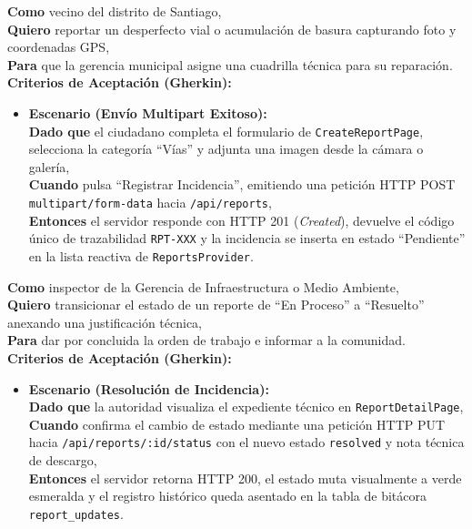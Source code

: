 \documentclass[12pt,a4paper]{article}
\begin{document}
\begin{tcolorbox}[colback=tableHeader,colframe=unsaacBlue,title=\textbf{HU-02: Registro de Incidencia Urbana con Geolocalización y Fotografía}]
\textbf{Como} vecino del distrito de Santiago, \\
\textbf{Quiero} reportar un desperfecto vial o acumulación de basura capturando foto y coordenadas GPS, \\
\textbf{Para} que la gerencia municipal asigne una cuadrilla técnica para su reparación.
\tcblower
\textbf{Criterios de Aceptación (Gherkin):}
\begin{itemize}[leftmargin=*]
    \item \textbf{Escenario (Envío Multipart Exitoso):} \\
    \textbf{Dado que} el ciudadano completa el formulario de \texttt{CreateReportPage}, selecciona la categoría ``Vías'' y adjunta una imagen desde la cámara o galería, \\
    \textbf{Cuando} pulsa ``Registrar Incidencia'', emitiendo una petición HTTP POST \texttt{multipart/form-data} hacia \texttt{/api/reports}, \\
    \textbf{Entonces} el servidor responde con HTTP 201 (\textit{Created}), devuelve el código único de trazabilidad \texttt{RPT-XXX} y la incidencia se inserta en estado ``Pendiente'' en la lista reactiva de \texttt{ReportsProvider}.
\end{itemize}
\end{tcolorbox}

\begin{tcolorbox}[colback=tableHeader,colframe=unsaacBlue,title=\textbf{HU-03: Gestión y Actualización Operativa por Cuadrilla Municipal}]
\textbf{Como} inspector de la Gerencia de Infraestructura o Medio Ambiente, \\
\textbf{Quiero} transicionar el estado de un reporte de ``En Proceso'' a ``Resuelto'' anexando una justificación técnica, \\
\textbf{Para} dar por concluida la orden de trabajo e informar a la comunidad.
\tcblower
\textbf{Criterios de Aceptación (Gherkin):}
\begin{itemize}[leftmargin=*]
    \item \textbf{Escenario (Resolución de Incidencia):} \\
    \textbf{Dado que} la autoridad visualiza el expediente técnico en \texttt{ReportDetailPage}, \\
    \textbf{Cuando} confirma el cambio de estado mediante una petición HTTP PUT hacia \texttt{/api/reports/:id/status} con el nuevo estado \texttt{resolved} y nota técnica de descargo, \\
    \textbf{Entonces} el servidor retorna HTTP 200, el estado muta visualmente a verde esmeralda y el registro histórico queda asentado en la tabla de bitácora \texttt{report\_updates}.
\end{itemize}
\end{tcolorbox}
\end{document}
